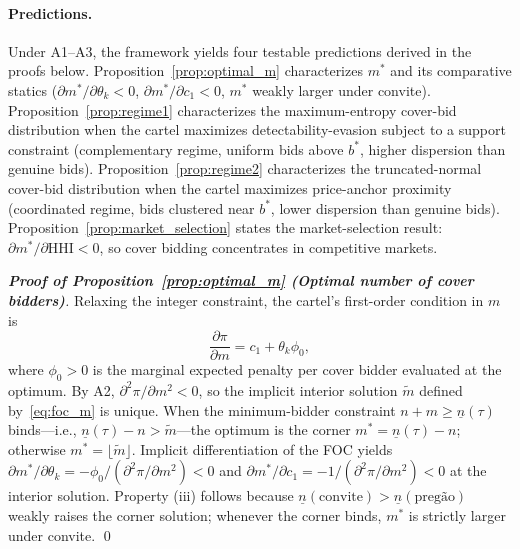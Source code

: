 \paragraph{Predictions.}
Under A1--A3, the framework yields four testable predictions
derived in the proofs below. Proposition~\ref{prop:optimal_m}
characterizes $m^*$ and its comparative statics
($\partial m^*/\partial \theta_k < 0$,
$\partial m^*/\partial c_1 < 0$, $m^*$ weakly larger under
convite). Proposition~\ref{prop:regime1} characterizes the
maximum-entropy cover-bid distribution when the cartel maximizes
detectability-evasion subject to a support constraint
(complementary regime, uniform bids above $b^*$, higher
dispersion than genuine bids). Proposition~\ref{prop:regime2}
characterizes the truncated-normal cover-bid distribution when
the cartel maximizes price-anchor proximity (coordinated
regime, bids clustered near $b^*$, lower dispersion than
genuine bids). Proposition~\ref{prop:market_selection} states
the market-selection result: $\partial m^*/\partial \mathrm{HHI} < 0$,
so cover bidding concentrates in competitive markets.

\begin{proof}[\textbf{Proof of Proposition~\ref{prop:optimal_m}
(Optimal number of cover bidders)}]
Relaxing the integer constraint, the cartel's first-order condition
in $m$ is
\begin{equation}
  \frac{\partial \pi}{\partial m} = c_1 + \theta_k \phi_0,
  \label{eq:foc_m}
\end{equation}
where $\phi_0 > 0$ is the marginal expected penalty per cover
bidder evaluated at the optimum. By A2,
$\partial^2 \pi / \partial m^2 < 0$, so the implicit interior
solution $\tilde{m}$ defined by~\eqref{eq:foc_m} is unique. When
the minimum-bidder constraint $n + m \geq \underline{n}(\tau)$
binds---i.e., $\underline{n}(\tau) - n > \tilde{m}$---the optimum
is the corner $m^* = \underline{n}(\tau) - n$; otherwise
$m^* = \lfloor \tilde{m} \rfloor$. Implicit differentiation of
the FOC yields
$\partial m^*/\partial \theta_k =
-\phi_0 / (\partial^2 \pi / \partial m^2) < 0$ and
$\partial m^*/\partial c_1 =
-1 / (\partial^2 \pi / \partial m^2) < 0$ at the interior
solution. Property (iii) follows because
$\underline{n}(\text{convite}) > \underline{n}(\text{preg\~ao})$
weakly raises the corner solution; whenever the corner binds,
$m^*$ is strictly larger under convite. \qed
\end{proof}

